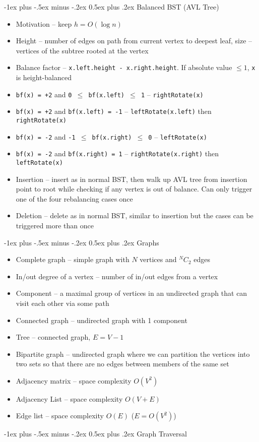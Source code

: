 \documentclass[10pt,landscape,a4paper]{article}
\makeatletter
\renewcommand{\section}{\@startsection{section}{1}{0mm}%
                                {-1ex plus -.5ex minus -.2ex}%
                                {0.5ex plus .2ex}%
                                {\normalfont\large\bfseries}}
\makeatother
\begin{document}
\begin{multicols}{4}
\section{Balanced BST (AVL Tree)}
\begin{itemize}
	\item Motivation -- keep $h=O(\log n)$ 
	\item Height -- number of edges on path from current vertex to deepest leaf, size -- vertices of the subtree rooted at the vertex
	\item Balance factor -- \texttt{x.left.height - x.right.height}. If absolute value  $\leq 1$, \texttt{x} is height-balanced
	\item \texttt{bf(x) = +2} and \texttt{0 $\leq$ bf(x.left) $\leq$ 1} -- \texttt{rightRotate(x)}
	\item \texttt{bf(x) = +2} and \texttt{bf(x.left) = -1} -- \texttt{leftRotate(x.left)} then \texttt{rightRotate(x)}
	\item \texttt{bf(x) = -2} and \texttt{-1 $\leq$ bf(x.right) $\leq$ 0} -- \texttt{leftRotate(x)}
	\item \texttt{bf(x) = -2} and \texttt{bf(x.right) = 1} -- \texttt{rightRotate(x.right)} then \texttt{leftRotate(x)}	
	\item Insertion -- insert as in normal BST, then walk up AVL tree from insertion point to root while checking if any vertex is out of balance. Can only trigger one of the four rebalancing cases once
	\item Deletion -- delete as in normal BST, similar to insertion but the cases can be triggered more than once
\end{itemize}
\section{Graphs}
\begin{itemize}
	\item Complete graph -- simple graph with $N$ vertices and  $^NC_2$ edges
	\item In/out degree of a vertex -- number of in/out edges from a vertex
	\item Component -- a maximal group of vertices in an undirected graph that can visit each other via some path
	\item Connected graph -- undirected graph with 1 component
	\item Tree -- connected graph,  $E=V-1$
	\item Bipartite graph -- undirected graph where we can partition the vertices into two sets so that there are no edges between members of the same set
	\item Adjacency matrix -- space complexity $O(V^2)$
	\item Adjacency List -- space complexity  $O(V+E)$
	\item Edge list -- space complexity  $O(E)$ ($E=O(V^2)$)
\end{itemize}
\section{Graph Traversal}

\end{multicols}
\end{document}
